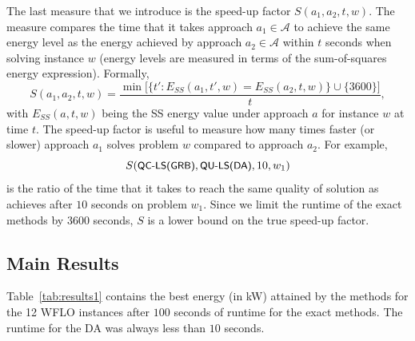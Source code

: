 \documentclass[preprint,12pt]{elsarticle}
\newcommand{\todo}[1]{{\textcolor{red}{\bf {#1}}}}
\newcommand{\qclsgrb}{{\sf {\small QC-LS(GRB)\xspace}}}
\newcommand{\qulsda}{{\sf {\small QU-LS(DA)\xspace}}}
\begin{document}
The last measure that we introduce is the speed-up factor $S(a_1, a_2, t, w)$. The measure compares the time that it takes
approach $a_1 \in \mathcal{A}$ to
achieve the same energy level as the energy achieved by approach $a_2 \in \mathcal{A}$
within $t$ seconds when solving instance $w$ (energy levels are measured in terms of the sum-of-squares energy expression). 
Formally, \begin{equation} S(a_1, a_2, t, w) = \frac{\min \big[\{ t' : E_{SS}(a_1, t',w) = E_{SS}(a_2, t, w) \} \cup \{3600\} \big] }{t}, \label{eq:speedup} \end{equation}
with $E_{SS}(a, t, w)$ being the SS energy value under approach $a$ for instance $w$ at time $t$. The speed-up factor 
is useful to measure how many times faster (or slower) approach $a_1$ solves problem $w$ compared to approach $a_2$.   
For example, $$S(\mbox{\emph{\qclsgrb}}, \mbox{\emph{\qulsda}}, 10, w_1)$$ is the ratio of the time that it takes \qclsgrb{} to 
reach the same quality of solution as \qulsda{} achieves after $10$ seconds on problem $w_1$. Since
we limit the runtime of the exact methods by $3600$ seconds, $S$ is a lower bound on the true speed-up factor. 


\subsection{Main Results}

Table~\ref{tab:results1} contains the best energy (in kW) attained by the methods
for the 12 WFLO instances after $100$ seconds of runtime for the exact methods. 
The runtime for the DA was always less than $10$ seconds.

\end{document}
